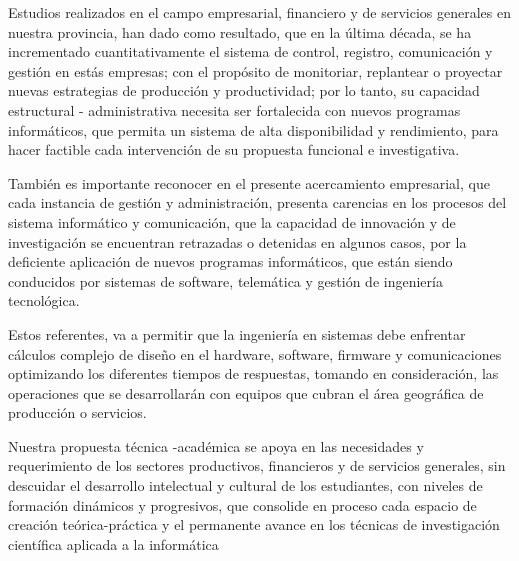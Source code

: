 Estudios realizados en el campo empresarial, financiero y de servicios generales en nuestra provincia, han dado como resultado, que  en la  última década,  se ha incrementado cuantitativamente el sistema  de control, registro, comunicación y gestión en estás empresas; con el propósito de monitoriar, replantear o proyectar nuevas estrategias de producción y productividad;  por lo tanto, su capacidad estructural - administrativa  necesita ser fortalecida con nuevos programas informáticos, que permita un sistema de alta disponibilidad y rendimiento, para hacer factible cada intervención de su propuesta funcional e investigativa.

También es importante reconocer en el presente acercamiento empresarial,  que cada instancia de gestión y administración, presenta carencias en los procesos del sistema informático  y comunicación, que  la capacidad de innovación  y de investigación se encuentran retrazadas o detenidas en algunos casos, por la deficiente  aplicación de nuevos programas informáticos, que están  siendo conducidos por sistemas de software, telemática y gestión de ingeniería tecnológica.

Estos referentes, va a permitir que la ingeniería en sistemas debe enfrentar cálculos complejo de diseño en el hardware, software, firmware y comunicaciones optimizando los diferentes tiempos de respuestas, tomando en consideración, las operaciones que se desarrollarán con equipos que cubran el área geográfica  de producción o servicios.

Nuestra propuesta técnica -académica  se apoya en las necesidades y requerimiento de los sectores productivos, financieros y de servicios generales, sin descuidar el desarrollo intelectual y cultural de los estudiantes, con niveles de formación dinámicos y progresivos, que consolide  en proceso cada espacio de creación teórica-práctica y el  permanente avance en los técnicas de investigación científica aplicada a la informática 


